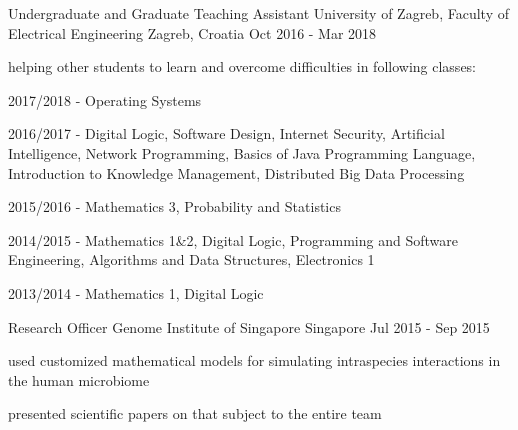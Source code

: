 \begin{cventries}
  \cventry
    {Undergraduate and Graduate Teaching Assistant} %
    {University of Zagreb, Faculty of Electrical Engineering} %
    {Zagreb, Croatia} %
    {Oct 2016 - Mar 2018} %
    {
      \begin{cvitems} %
        \item {helping other students to learn and overcome difficulties in following classes:}
        \item {2017/2018 - Operating Systems}
        \item {2016/2017 - Digital Logic, Software Design, Internet Security, Artificial Intelligence, Network Programming, Basics of Java Programming Language, Introduction to Knowledge Management, Distributed Big Data Processing}
        \item {2015/2016 - Mathematics 3, Probability and Statistics}
        \item {2014/2015 - Mathematics 1\&2, Digital Logic, Programming and Software Engineering, Algorithms and Data Structures, Electronics 1}
        \item {2013/2014 - Mathematics 1, Digital Logic}
      \end{cvitems}
    }



  \cventry
    {Research Officer} %
    {Genome Institute of Singapore} %
    {Singapore} %
    {Jul 2015 - Sep 2015} %
    {
      \begin{cvitems} %
        \item {used customized mathematical models for simulating intraspecies interactions in the human microbiome}
        \item {presented scientific papers on that subject to the entire team}
      \end{cvitems}
    }

\end{cventries}
